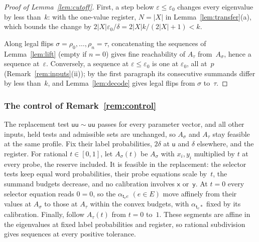 \begin{proof}[Proof of Lemma~\ref{lem:cutoff}]
First, a step below $\varepsilon\le\varepsilon_0$ changes every eigenvalue
by less than~$k$: with the one-value register, $N=|X|$ in
Lemma~\ref{lem:transfer}(a), which bounds the change by
$2|X|\varepsilon_0/\delta=2|X|k/(2|X|+1)<k$.

Along legal flips $\sigma=\rho_0,\dots,\rho_n=\tau$, concatenating the
sequences of Lemma~\ref{lem:lift} (empty if $n=0$) gives fine reachability
of $A_\tau$ from~$A_\sigma$, hence a sequence at~$\varepsilon$. Conversely,
a sequence at $\varepsilon\le\varepsilon_0$ is one at $\varepsilon_0$, all
at~$p$ (Remark~\ref{rem:inputs}(ii)); by the first paragraph its
consecutive summands differ by less than~$k$, and Lemma~\ref{lem:decode}
gives legal flips from $\sigma$ to~$\tau$.
\end{proof}

\subsubsection{The control of Remark~\ref{rem:control}}\label{app:ncl-control}

The replacement test $\mathsf{uu}\sim\mathsf{uu}$ passes for every parameter
vector, and all other inputs, held tests and admissible sets are
unchanged, so $A_\sigma$ and $A_\tau$ stay feasible at the same profile.
Fix their label probabilities, $2\delta$ at $\mathsf u$ and $\delta$
elsewhere, and the register. For rational $t\in[0,1]$, let $A_\sigma(t)$
be $A_\sigma$ with $x_i,y_i$ multiplied by $t$ at every probe, the reserve
included. It is feasible in the replacement: the selector tests keep equal
word probabilities, their probe equations scale by~$t$, the summand
budgets decrease, and no calibration involves $\mathsf x$ or~$\mathsf y$.
At $t=0$ every selector equation reads $0=0$, so the
$\alpha_{\mathsf t_ve}$ $(e\in E)$ move affinely from their values at
$A_\sigma$ to those at $A_\tau$ within the convex budgets, with
$\alpha_{\mathsf t_v\ast}$ fixed by its calibration. Finally, follow
$A_\tau(t)$ from $t=0$ to~$1$. These segments are affine in the
eigenvalues at fixed label probabilities and register, so rational
subdivision gives sequences at every positive
tolerance.


